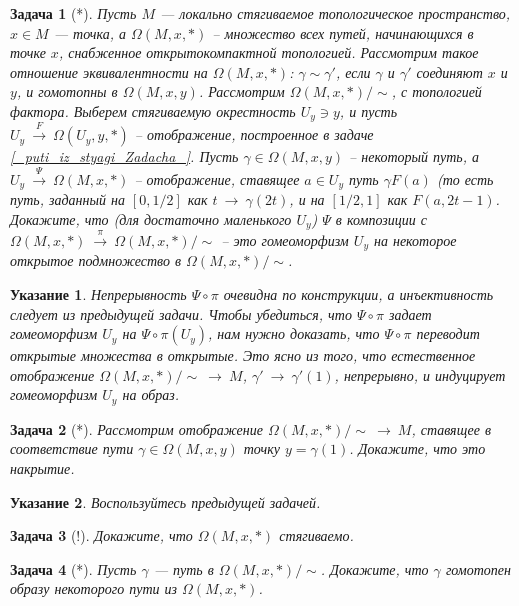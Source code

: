 \documentclass[12pt]{book}
\newcommand{\arrow}{{\:\longrightarrow\:}}
\theoremstyle{upshape}
\newtheorem{zadacha}{Задача}[chapter]
\theoremstyle{generic}
\theoremstyle{upshapenonumber}
\newtheorem{ukazanie}{Указание}[section]
\newcommand{\следствие}{%
     \refstepcounter{teorema}
     {\noindent\bf Следствие \thechapter.\arabic{teorema}:\ }}
\newcommand{\пример}{%
     \refstepcounter{teorema}
     {\noindent\bf Пример \thechapter.\arabic{teorema}:\ }}
\newcommand{\лемма}{%
     \refstepcounter{teorema}
     {\noindent\bf Лемма \thechapter.\arabic{teorema}:\ }}
\newcommand{\теорема}{%
     \refstepcounter{teorema}
     {\noindent\bf Теорема \thechapter.\arabic{teorema}:\ }}
\newcommand{\утверждение}{%
     \refstepcounter{teorema}
     {\noindent\bf Утверждение \thechapter.\arabic{teorema}:\ }}
\begin{document}
{\begin{zadacha}[*]
Пусть $M$ --- локально стягиваемое топологическое
пространство, $x \in M$ --- точка, а $\Omega(M, x, *)$ 
-- множество всех путей,
начинающихся в точке $x$, снабженное открытокомпактной топологией. 
Рассмотрим такое отношение эквивалентности на 
$\Omega(M,x, *)$: $\gamma\sim\gamma'$, если
$\gamma$ и $\gamma'$ соединяют $x$ и $y$,
и гомотопны в $\Omega(M, x, y)$. Рассмотрим
$\Omega(M, x, *)/\sim$, с топологией фактора.
Выберем стягиваемую окрестность $U_y\ni y$,
и пусть $U_y\stackrel F \arrow \Omega(U_y, y, *)$ --
отображение, построенное в задаче 
\ref{_puti_iz_styagi_Zadacha_}. 
Пусть $\gamma\in \Omega(M, x, y)$ --
некоторый путь, а $U_y \stackrel\Psi\arrow \Omega(M, x, *)$ --
отображение, ставящее $a\in U_y$ путь
$\gamma F(a)$ (то есть путь, заданный
на $[0, 1/2]$ как $t \arrow \gamma(2t)$,
и на $[1/2,1]$ как $F(a, 2t-1)$.
Докажите, что (для достаточно маленького 
$U_y$) $\Psi$ в композиции с 
$\Omega(M, x, *)\stackrel\pi\arrow\Omega(M, x, *)/\sim$ --
это гомеоморфизм $U_y$ на некоторое открытое
подмножество в $\Omega(M, x, *)/\sim$.
\end{zadacha}

\begin{ukazanie}
Непрерывность $\Psi\circ\pi$  
очевидна по конструкции, а инъективность
следует из предыдущей задачи. Чтобы убедиться, что
$\Psi\circ\pi$  задает гомеоморфизм $U_y$ на
$\Psi\circ\pi(U_y)$, нам нужно доказать, что
$\Psi\circ\pi$ переводит открытые множества
в открытые. Это ясно из того, что
естественное отображение $\Omega(M, x, *)/\sim\arrow M$,
$\gamma'\arrow \gamma'(1)$, непрерывно,
и индуцирует гомеоморфизм $U_y$ на образ.
\end{ukazanie}

\begin{zadacha}[*]
Рассмотрим отображение $\Omega(M, x, *)/\sim\arrow M$,
ставящее в соответствие пути $\gamma\in \Omega(M, x, y)$
точку  $y=\gamma(1)$. Докажите, что это накрытие.
\end{zadacha}

\begin{ukazanie}
Воспользуйтесь предыдущей задачей.
\end{ukazanie}

\begin{zadacha}[!]
Докажите, что $\Omega(M, x, *)$ стягиваемо.
\end{zadacha}

\begin{zadacha}[*]
Пусть $\gamma$ --- путь в $\Omega(M, x, *)/\sim$.
Докажите, что $\gamma$ гомотопен образу некоторого пути из
$\Omega(M, x, *)$.
\end{zadacha}

}
\end{document}
